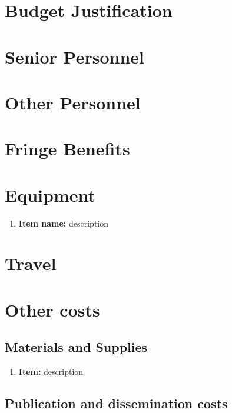 \documentclass[fontsize=10pt,paper=letter,twoside=false,onecolumn,headings=small]{scrartcl} %
\begin{document}
\section*{Budget Justification}

\section{Senior Personnel}

\setcounter{section}{1}\section{Other Personnel}

\setcounter{section}{2}\section{Fringe Benefits}

\setcounter{section}{3}\section{Equipment}
\begin{enumerate}[D1]
	\item\textbf{Item name:}
		description	
\end{enumerate}

\setcounter{section}{4}\section{Travel}


\setcounter{section}{6}\section{Other costs}

\subsection{Materials and Supplies}
\begin{enumerate}[G{1}.1]
	\item\textbf{Item:}
		description
\end{enumerate}

\setcounter{subsection}{1}\subsection{Publication and dissemination costs}
\end{document}
